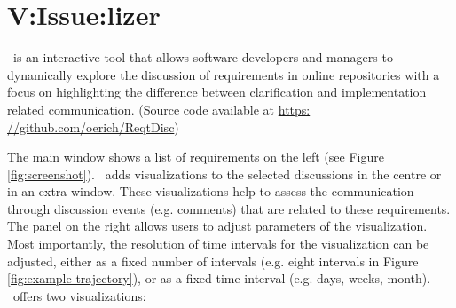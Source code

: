 \section{V:Issue:lizer}

\viss\  is an interactive tool that allows software developers and managers to dynamically explore the discussion of requirements  in online repositories with a focus on highlighting the difference between clarification and implementation related communication. (Source code available at \url{https: //github.com/oerich/ReqtDisc})

The main window shows a list of requirements on the  left  (see Figure \ref{fig:screenshot}).
\viss\ adds visualizations to the selected discussions in the centre or in an extra window. 
These visualizations help to assess the communication through discussion events (e.g. comments) that are related to these requirements.
The panel on the right allows users to adjust parameters of the visualization.
Most importantly, the resolution of time intervals for the visualization can be adjusted, either as a fixed number of intervals (e.g. eight intervals in Figure \ref{fig:example-trajectory}), or as a fixed time interval (e.g. days, weeks, month).
%
\viss\  offers  two visualizations: 

